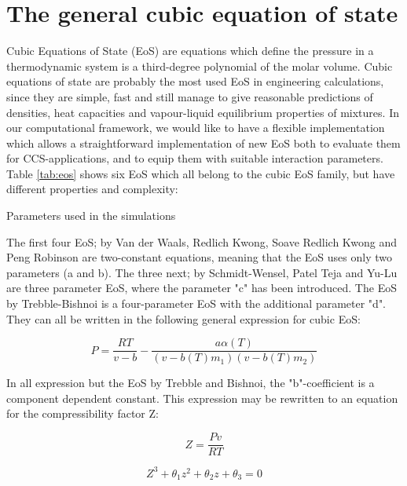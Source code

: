 \documentclass[a4paper, 12pt, english, sintefheadings, sintefcolour]{sintefmemo}
\begin{document}
\section{The general cubic equation of state}
\label{sec:cubicch}
Cubic Equations of State (EoS) are equations which define the pressure in a
thermodynamic system is a third-degree polynomial of the molar volume. Cubic
equations of state are probably the most used EoS in engineering calculations,
since they are simple, fast and still manage to give reasonable predictions of
densities, heat capacities and vapour-liquid equilibrium properties of
mixtures. In our computational framework, we would like to have a flexible
implementation which allows a straightforward implementation of new EoS both
to evaluate them for CCS-applications, and to equip them with suitable
interaction parameters. Table \ref{tab:eos} shows six EoS which all belong to
the cubic EoS family, but have different properties and complexity:

\begin{table}[htb]
\begin{minipage}[l]{0.58\linewidth}
\caption{Parameters used in the simulations}
\vspace{-3mm}

\label{tab:eos}
\end{minipage}
\end{table}  
  
The first four EoS; by Van der Waals, Redlich Kwong, Soave Redlich Kwong and
Peng Robinson are two-constant equations, meaning that the EoS uses only two
parameters (a and b). The three next; by Schmidt-Wensel, Patel Teja and Yu-Lu
are three parameter EoS, where the parameter "c" has been introduced. The EoS
by Trebble-Bishnoi is a four-parameter EoS with the additional parameter
"d". They can all be written in the following general expression for cubic
EoS:

\begin{equation}
P=\frac{RT}{v-b}-\frac{a\alpha(T)}{\left(v-b(T)m_1\right)\left(v-b(T)m_2\right)}
\label{eq:eosg}
\end{equation}

In all expression but the EoS by Trebble and Bishnoi, the "b"-coefficient is a
component dependent constant. This expression may be rewritten to an equation
for the compressibility factor Z:

\begin{equation}
Z=\frac{Pv}{RT}
\end{equation}

\begin{equation}
Z^3+\theta_1z^2+\theta_2z+\theta_3=0
\label{eq:theta}
\end{equation} 
\end{document}
